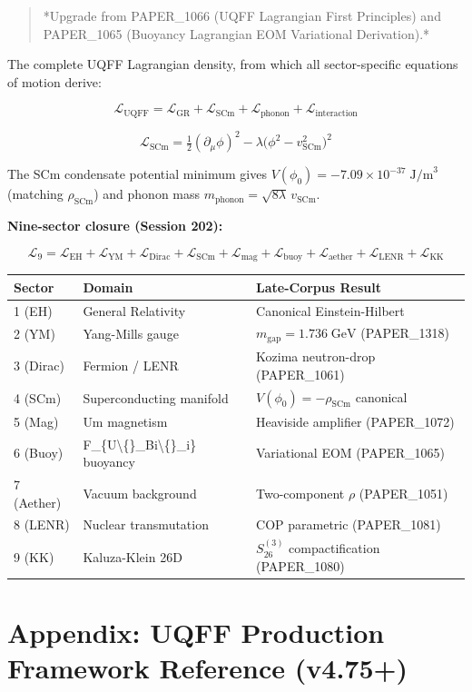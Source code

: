 \documentclass[11pt]{article}
\begin{document}
\begin{quote}
*Upgrade from PAPER\_1066 (UQFF Lagrangian First Principles) and
PAPER\_1065 (Buoyancy Lagrangian EOM Variational Derivation).*
\end{quote}

The complete UQFF Lagrangian density, from which all sector-specific equations of motion derive:

$$\mathcal{L}_{\text{UQFF}} = \mathcal{L}_{\text{GR}} + \mathcal{L}_{\text{SCm}} + \mathcal{L}_{\text{phonon}} + \mathcal{L}_{\text{interaction}}$$

$$\mathcal{L}_{\text{SCm}} = \tfrac{1}{2}(\partial_\mu \phi)^2 - \lambda\bigl(\phi^2 - v_{\text{SCm}}^2\bigr)^2$$

The SCm condensate potential minimum gives $V(\phi_0) = -7.09 \times 10^{-37}\;\text{J/m}^3$ (matching $\rho_{\text{SCm}}$) and phonon mass $m_{\text{phonon}} = \sqrt{8\lambda}\,v_{\text{SCm}}$.

\textbf{Nine-sector closure (Session 202):}

$$\mathcal{L}_{9} = \mathcal{L}_{\text{EH}} + \mathcal{L}_{\text{YM}} + \mathcal{L}_{\text{Dirac}} + \mathcal{L}_{\text{SCm}} + \mathcal{L}_{\text{mag}} + \mathcal{L}_{\text{buoy}} + \mathcal{L}_{\text{aether}} + \mathcal{L}_{\text{LENR}} + \mathcal{L}_{\text{KK}}$$

\begin{center}
\begin{longtable}{lll}
\toprule
Sector & Domain & Late-Corpus Result \tabularnewline
\midrule
\endhead
1 (EH) & General Relativity & Canonical Einstein-Hilbert \tabularnewline
2 (YM) & Yang-Mills gauge & $m_{\text{gap}} = 1.736\;\text{GeV}$ (PAPER\_1318) \tabularnewline
3 (Dirac) & Fermion / LENR & Kozima neutron-drop (PAPER\_1061) \tabularnewline
4 (SCm) & Superconducting manifold & $V(\phi_0) = -\rho_{\text{SCm}}$ canonical \tabularnewline
5 (Mag) & Um magnetism & Heaviside amplifier (PAPER\_1072) \tabularnewline
6 (Buoy) & F\_\{U\textbackslash\{\}\_Bi\textbackslash\{\}\_i\} buoyancy & Variational EOM (PAPER\_1065) \tabularnewline
7 (Aether) & Vacuum background & Two-component $\rho$ (PAPER\_1051) \tabularnewline
8 (LENR) & Nuclear transmutation & COP parametric (PAPER\_1081) \tabularnewline
9 (KK) & Kaluza-Klein 26D & $S_{26}^{(3)}$ compactification (PAPER\_1080) \tabularnewline
\bottomrule
\end{longtable}
\end{center}

\section*{Appendix: UQFF Production Framework Reference (v4.75+)}
\end{document}
